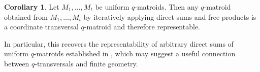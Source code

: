 \documentclass{article}
\theoremstyle{definition}
\newtheorem{corollary}[theorem]{{{Corollary}}}
\begin{document}
\begin{corollary}
Let $M_1,\dots,M_t$ be uniform $q$-matroids. Then any $q$-matroid obtained from $M_1,\dots,M_t$ by iteratively applying direct sums and free products is a coordinate transversal $q$-matroid and therefore representable.
\end{corollary}

In particular, this recovers the representability of arbitrary direct sums of uniform $q$-matroids established in \cite{alfarano2026representability}, which may suggest a useful connection between $q$-transversals and finite geometry.



\end{document}
